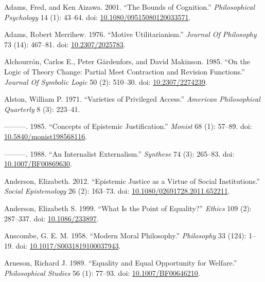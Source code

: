\documentclass[
  10pt,
  letterpaper,
  DIV=11,
  numbers=noendperiod,
  twoside]{scrartcl}
\newlength{\cslhangindent}
\newenvironment{CSLReferences}[2] %
 {\begin{list}{}{%
  \setlength{\itemindent}{0pt}
  \setlength{\leftmargin}{0pt}
  \setlength{\parsep}{0pt}
  \ifodd #1
   \setlength{\leftmargin}{\cslhangindent}
   \setlength{\itemindent}{-1\cslhangindent}
  \fi
  \setlength{\itemsep}{#2\baselineskip}}}
 {\end{list}}
\begin{document}
\newpage

\label{refs}
\begin{CSLReferences}{1}{0}
Adams, Fred, and Ken Aizawa. 2001. {``The Bounds of Cognition.''}
\emph{Philosophical Psychology} 14 (1): 43--64. doi:
\href{https://doi.org/10.1080/09515080120033571}{10.1080/09515080120033571}.

Adams, Robert Merrihew. 1976. {``Motive Utilitarianism.''} \emph{Journal
Of Philosophy} 73 (14): 467--81. doi:
\href{https://doi.org/10.2307/2025783}{10.2307/2025783}.

Alchourrón, Carlos E., Peter Gärdenfors, and David Makinson. 1985. {``On
the Logic of Theory Change: Partial Meet Contraction and Revision
Functions.''} \emph{Journal Of Symbolic Logic} 50 (2): 510--30. doi:
\href{https://doi.org/10.2307/2274239}{10.2307/2274239}.

Alston, William P. 1971. {``Varieties of Privileged Access.''}
\emph{American Philosophical Quarterly} 8 (3): 223--41.

---------. 1985. {``Concepts of Epistemic Justification.''}
\emph{Monist} 68 (1): 57--89. doi:
\href{https://doi.org/10.5840/monist198568116}{10.5840/monist198568116}.

---------. 1988. {``An Internalist Externalism.''} \emph{Synthese} 74
(3): 265--83. doi:
\href{https://doi.org/10.1007/BF00869630}{10.1007/BF00869630}.

Anderson, Elizabeth. 2012. {``Epistemic Justice as a Virtue of Social
Institutions.''} \emph{Social Epistemology} 26 (2): 163--73. doi:
\href{https://doi.org/10.1080/02691728.2011.652211}{10.1080/02691728.2011.652211}.

Anderson, Elizabeth S. 1999. {``What Is the Point of Equality?''}
\emph{Ethics} 109 (2): 287--337. doi:
\href{https://doi.org/10.1086/233897}{10.1086/233897}.

Anscombe, G. E. M. 1958. {``Modern Moral Philosophy.''}
\emph{Philosophy} 33 (124): 1--19. doi:
\href{https://doi.org/10.1017/S0031819100037943}{10.1017/S0031819100037943}.

Arneson, Richard J. 1989. {``Equality and Equal Opportunity for
Welfare.''} \emph{Philosophical Studies} 56 (1): 77--93. doi:
\href{https://doi.org/10.1007/BF00646210}{10.1007/BF00646210}.


\end{CSLReferences}
\end{document}

